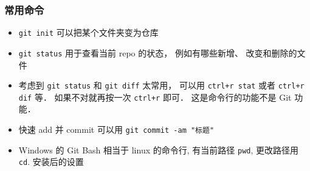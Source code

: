 \subsubsection{常用命令}
\begin{itemize}
\item \verb|git init| 可以把某个文件夹变为仓库
\item \verb|git status| 用于查看当前 repo 的状态， 例如有哪些新增、 改变和删除的文件
\item 考虑到 \verb|git status| 和 \verb|git diff| 太常用， 可以用 \verb|ctrl+r stat| 或者 \verb|ctrl+r dif| 等． 如果不对就再按一次 \verb|ctrl+r| 即可． 这是命令行的功能不是 Git 功能．
\item 快速 add 并 commit 可以用 \verb|git commit -am "标题"|
\item Windows 的 Git Bash 相当于 linux 的命令行, 有当前路径 \verb|pwd|, 更改路径用 \verb|cd|.
安装后的设置
\end{itemize}

